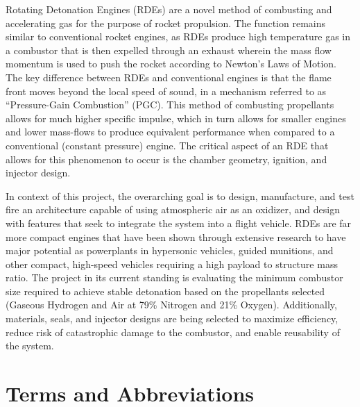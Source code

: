 Rotating Detonation Engines (RDEs) are a novel method of combusting and accelerating gas for the purpose of rocket propulsion. The function remains similar to conventional rocket engines, as RDEs produce high temperature gas in a combustor that is then expelled through an exhaust wherein the mass flow momentum is used to push the rocket according to Newton’s Laws of Motion. The key difference between RDEs and conventional engines is that the flame front moves beyond the local speed of sound, in a mechanism referred to as “Pressure-Gain Combustion” (PGC). This method of combusting propellants allows for much higher specific impulse, which in turn allows for smaller engines and lower mass-flows to produce equivalent performance when compared to a conventional (constant pressure) engine. The critical aspect of an RDE that allows for this phenomenon to occur is the chamber geometry, ignition, and injector design.


In context of this project, the overarching goal is to design, manufacture, and test fire an architecture capable of using atmospheric air as an oxidizer, and design with features that seek to integrate the system into a flight vehicle. RDEs are far more compact engines that have been shown through extensive research to have major potential as powerplants in hypersonic vehicles, guided munitions, and other compact, high-speed vehicles requiring a high payload to structure mass ratio. The project in its current standing is evaluating the minimum combustor size required to achieve stable detonation based on the propellants selected (Gaseous Hydrogen and Air at 79\% Nitrogen and 21\% Oxygen). Additionally, materials, seals, and injector designs are being selected to maximize efficiency, reduce risk of catastrophic damage to the combustor, and enable reusability of the system.

\singlespacing
\newpage

\tableofcontents

\newpage

\listoffigures

\newpage

\listoftables

\newpage

\section*{Terms and Abbreviations}

